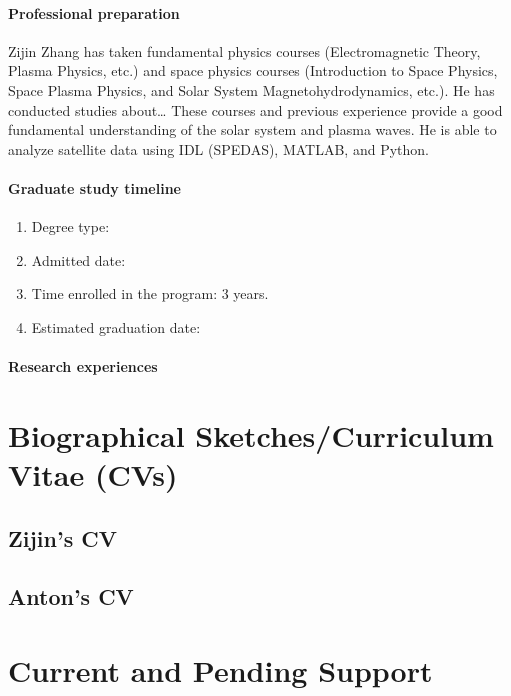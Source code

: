 \documentclass[
  letterpaper,
  DIV=11,
  numbers=noendperiod,
  oneside]{scrartcl}
\let\oldparagraph\paragraph
\renewcommand{\paragraph}[1]{\oldparagraph{#1}\mbox{}}
\providecommand{\tightlist}{%
  \setlength{\itemsep}{0pt}\setlength{\parskip}{0pt}}\usepackage{longtable,booktabs,array}
\begin{document}
\paragraph{Professional preparation}\label{professional-preparation}

Zijin Zhang has taken fundamental physics courses (Electromagnetic
Theory, Plasma Physics, etc.) and space physics courses (Introduction to
Space Physics, Space Plasma Physics, and Solar System
Magnetohydrodynamics, etc.). He has conducted studies about\ldots{}
These courses and previous experience provide a good fundamental
understanding of the solar system and plasma waves. He is able to
analyze satellite data using IDL (SPEDAS), MATLAB, and Python.

\paragraph{Graduate study timeline}\label{graduate-study-timeline}

\begin{enumerate}
\def\labelenumi{\roman{enumi})}
\tightlist
\item
  Degree type:
\item
  Admitted date:
\item
  Time enrolled in the program: 3 years.
\item
  Estimated graduation date:
\end{enumerate}

\paragraph{Research experiences}\label{research-experiences}

\section{Biographical Sketches/Curriculum Vitae
(CVs)}\label{biographical-sketchescurriculum-vitae-cvs}

\subsection{Zijin's CV}\label{zijins-cv}

\subsection{Anton's CV}\label{antons-cv}

\section{Current and Pending Support}\label{current-and-pending-support}
\end{document}
